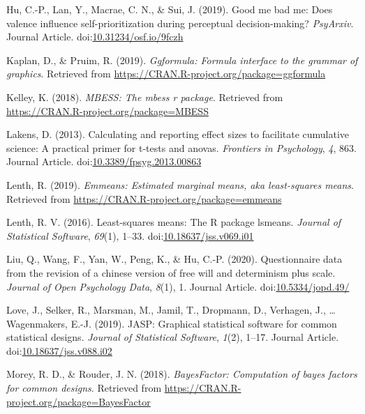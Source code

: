 \documentclass[
  man]{apa6}
\begin{document}
\leavevmode\hypertarget{ref-Hu_2019_GoodSelf}{}%
Hu, C.-P., Lan, Y., Macrae, C. N., \& Sui, J. (2019). Good me bad me: Does valence influence self-prioritization during perceptual decision-making? \emph{PsyArxiv}. Journal Article. doi:\href{https://doi.org/10.31234/osf.io/9fczh}{10.31234/osf.io/9fczh}

\leavevmode\hypertarget{ref-R-ggformula}{}%
Kaplan, D., \& Pruim, R. (2019). \emph{Ggformula: Formula interface to the grammar of graphics}. Retrieved from \url{https://CRAN.R-project.org/package=ggformula}

\leavevmode\hypertarget{ref-R-MBESS}{}%
Kelley, K. (2018). \emph{MBESS: The mbess r package}. Retrieved from \url{https://CRAN.R-project.org/package=MBESS}

\leavevmode\hypertarget{ref-Lakens_2013}{}%
Lakens, D. (2013). Calculating and reporting effect sizes to facilitate cumulative science: A practical primer for t-tests and anovas. \emph{Frontiers in Psychology}, \emph{4}, 863. Journal Article. doi:\href{https://doi.org/10.3389/fpsyg.2013.00863}{10.3389/fpsyg.2013.00863}

\leavevmode\hypertarget{ref-R-emmeans}{}%
Lenth, R. (2019). \emph{Emmeans: Estimated marginal means, aka least-squares means}. Retrieved from \url{https://CRAN.R-project.org/package=emmeans}

\leavevmode\hypertarget{ref-R-lsmeans}{}%
Lenth, R. V. (2016). Least-squares means: The R package lsmeans. \emph{Journal of Statistical Software}, \emph{69}(1), 1--33. doi:\href{https://doi.org/10.18637/jss.v069.i01}{10.18637/jss.v069.i01}

\leavevmode\hypertarget{ref-Liu_2020_JOPD}{}%
Liu, Q., Wang, F., Yan, W., Peng, K., \& Hu, C.-P. (2020). Questionnaire data from the revision of a chinese version of free will and determinism plus scale. \emph{Journal of Open Psychology Data}, \emph{8}(1), 1. Journal Article. doi:\href{https://doi.org/10.5334/jopd.49/}{10.5334/jopd.49/}

\leavevmode\hypertarget{ref-Love_etal_2019_JASP}{}%
Love, J., Selker, R., Marsman, M., Jamil, T., Dropmann, D., Verhagen, J., \ldots{} Wagenmakers, E.-J. (2019). JASP: Graphical statistical software for common statistical designs. \emph{Journal of Statistical Software}, \emph{1}(2), 1--17. Journal Article. doi:\href{https://doi.org/10.18637/jss.v088.i02}{10.18637/jss.v088.i02}

\leavevmode\hypertarget{ref-R-BayesFactor}{}%
Morey, R. D., \& Rouder, J. N. (2018). \emph{BayesFactor: Computation of bayes factors for common designs}. Retrieved from \url{https://CRAN.R-project.org/package=BayesFactor}
\end{document}
